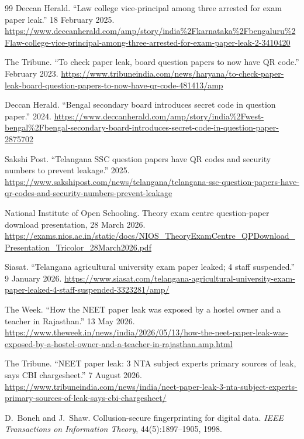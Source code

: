 \documentclass[10pt,a4paper]{article}
\theoremstyle{remark}
\begin{document}
\begin{thebibliography}{99}
 Deccan Herald. \enquote{Law college vice-principal among three arrested for exam paper leak.} 18 February 2025. \url{https://www.deccanherald.com/amp/story/india%2Fkarnataka%2Fbengaluru%2Flaw-college-vice-principal-among-three-arrested-for-exam-paper-leak-2-3410420}

 The Tribune. \enquote{To check paper leak, board question papers to now have QR code.} February 2023. \url{https://www.tribuneindia.com/news/haryana/to-check-paper-leak-board-question-papers-to-now-have-qr-code-481413/amp}

 Deccan Herald. \enquote{Bengal secondary board introduces secret code in question paper.} 2024. \url{https://www.deccanherald.com/amp/story/india%2Fwest-bengal%2Fbengal-secondary-board-introduces-secret-code-in-question-paper-2875702}

 Sakshi Post. \enquote{Telangana SSC question papers have QR codes and security numbers to prevent leakage.} 2025. \url{https://www.sakshipost.com/news/telangana/telangana-ssc-question-papers-have-qr-codes-and-security-numbers-prevent-leakage}

 National Institute of Open Schooling. Theory exam centre question-paper download presentation, 28 March 2026. \url{https://exams.nios.ac.in/static/docs/NIOS_TheoryExamCentre_QPDownload_Presentation_Tricolor_28March2026.pdf}

 Siasat. \enquote{Telangana agricultural university exam paper leaked; 4 staff suspended.} 9 January 2026. \url{https://www.siasat.com/telangana-agricultural-university-exam-paper-leaked-4-staff-suspended-3323281/amp/}

 The Week. \enquote{How the NEET paper leak was exposed by a hostel owner and a teacher in Rajasthan.} 13 May 2026. \url{https://www.theweek.in/news/india/2026/05/13/how-the-neet-paper-leak-was-exposed-by-a-hostel-owner-and-a-teacher-in-rajasthan.amp.html}

 The Tribune. \enquote{NEET paper leak: 3 NTA subject experts primary sources of leak, says CBI chargesheet.} 7 August 2026. \url{https://www.tribuneindia.com/news/india/neet-paper-leak-3-nta-subject-experts-primary-sources-of-leak-says-cbi-chargesheet/}

 D.~Boneh and J.~Shaw. Collusion-secure fingerprinting for digital data. \emph{IEEE Transactions on Information Theory}, 44(5):1897--1905, 1998.


\end{thebibliography}
\end{document}
